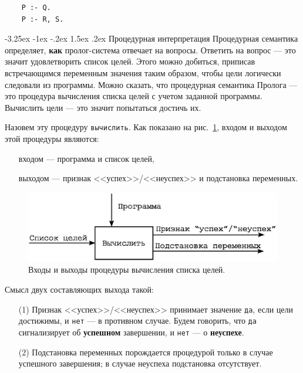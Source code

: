 \documentclass[12pt, openany, twoside]{book} %
\makeatletter
\renewcommand\section{\@startsection {section}{1}{\z@}%
                                   {-3.25ex \@plus -1ex \@minus -.2ex}%
                                   {1.5ex \@plus.2ex}%
                                   {\normalfont\large\bfseries}}
\makeatother
\begin{document}
{\tt\begin{verbatim}
    Р :- Q.
    Р :- R, S.
\end{verbatim}}

\section{Процедурная интерпретация}
Процедурная семантика определяет, \textbf{как} пролог-система отвечает на вопросы. Ответить на вопрос --- это значит удовлетворить список целей. Этого можно добиться, приписав встречающимся переменным значения таким образом, чтобы цели логически следовали из программы. Можно сказать, что процедурная семантика Пролога --- это процедура вычисления списка целей с учетом заданной программы. Вычислить цели --- это значит попытаться достичь их.

Назовем эту процедуру \texttt{вычислить}. Как показано на рис.~\ref{pic:proc}, входом и выходом этой процедуры являются:
\begin{itemize}
\item[] входом --- программа и список целей,
\item[] выходом --- признак <<успех>>/<<неуспех>> и подстановка переменных.
\end{itemize}

\begin{figure}[h]
\begin{center}
\includegraphics[scale=0.7]{pics/imp_proc.eps}
\end{center}
\caption{Входы и выходы процедуры вычисления списка целей.}
\label{pic:proc}
\end{figure}

\noindent Смысл двух составляющих выхода такой:
\begin{itemize}
\item[(1)] Признак <<успех>>/<<неуспех>> принимает значение {\tt да}, если цели достижимы, и {\tt нет} --- в противном случае. Будем говорить, что {\tt да} сигнализирует об {\bf успешном} завершении, и {\tt нет} --- о {\bf неуспехе}.

\item[(2)] Подстановка переменных порождается процедурой только в случае успешного завершения; в случае неуспеха подстановка отсутствует.
\end{itemize}
\end{document}
